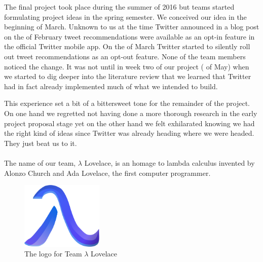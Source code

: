 \documentclass{article}
\begin{document}
The final project took place during the summer of 2016 but teams started formulating project ideas in the spring semester. We conceived our idea in the beginning of March. Unknown to us at the time Twitter announced in a blog post \cite{twitter-opt-in} on the  of February tweet recommendations were available as an opt-in feature in the official Twitter mobile app. On the  of March Twitter started to silently roll out tweet recommendations as an opt-out feature. None of the team members noticed the change. It was not until in week two of our project ( of May) when we started to dig deeper into the literature review that we learned that Twitter had in fact already implemented much of what we intended to build.

This experience set a bit of a bittersweet tone for the remainder of the project. On one hand we regretted not having done a more thorough research in the early project proposal stage yet on the other hand we felt exhilarated knowing we had the right kind of ideas since Twitter was already heading where we were headed. They just beat us to it.
\\\\
The name of our team, $\lambda$ Lovelace, is an homage to lambda calculus invented by Alonzo Church and Ada Lovelace, the first computer programmer.

\vspace{2em}

\begin{figure}[H]
    \includegraphics[width=0.35\textwidth, center]{ll-logo}
    \caption{The logo for Team $\lambda$ Lovelace}
\end{figure}


\newpage
\end{document}
